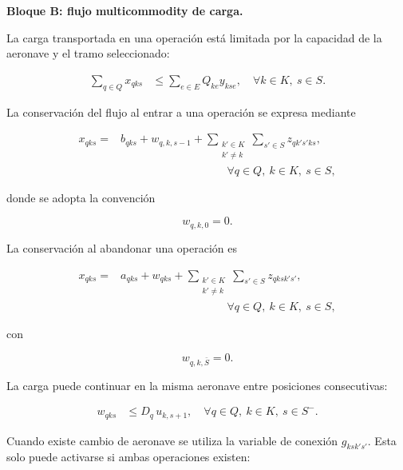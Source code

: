 
\vspace{0.5em}
\noindent\textbf{Bloque B: flujo multicommodity de carga.}

La carga transportada en una operación está limitada por la capacidad de la aeronave y el
tramo seleccionado:

\begin{align}
\sum_{q\in Q}x_{qks}
&\leq
\sum_{e\in E}Q_{ke}y_{kse},
\quad
\forall k\in K,\ s\in S.
\tag{R6}
\label{eq:r6}
\end{align}

La conservación del flujo al entrar a una operación se expresa mediante

\begin{align}
x_{qks}
={}&
b_{qks}
+
w_{q,k,s-1}
+
\sum_{\substack{k'\in K\\k'\neq k}}
\sum_{s'\in S}
z_{qk's'ks},
\nonumber\\[-1mm]
&\hspace{4cm}
\forall q\in Q,\ k\in K,\ s\in S,
\tag{R7a}
\label{eq:r7a}
\end{align}

donde se adopta la convención

\[
w_{q,k,0}=0.
\]

La conservación al abandonar una operación es

\begin{align}
x_{qks}
={}&
a_{qks}
+
w_{qks}
+
\sum_{\substack{k'\in K\\k'\neq k}}
\sum_{s'\in S}
z_{qksk's'},
\nonumber\\[-1mm]
&\hspace{4cm}
\forall q\in Q,\ k\in K,\ s\in S,
\tag{R7b}
\label{eq:r7b}
\end{align}

con

\[
w_{q,k,\bar S}=0.
\]

La carga puede continuar en la misma aeronave entre posiciones consecutivas:

\begin{align}
w_{qks}
&\leq
D_q\,u_{k,s+1},
\quad
\forall q\in Q,\ k\in K,\ s\in S^-.
\tag{R8a}
\label{eq:r8a}
\end{align}

Cuando existe cambio de aeronave se utiliza la variable de conexión $g_{ksk's'}$. Esta solo
puede activarse si ambas operaciones existen:

